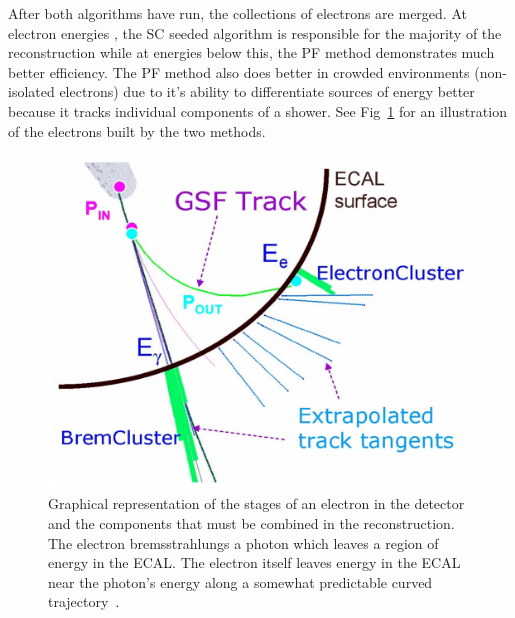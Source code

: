 	After both algorithms have run, the collections of electrons are merged. At electron energies  \GeV, the SC seeded algorithm is responsible for the majority of the reconstruction while at energies below this, the PF method demonstrates much better efficiency. The PF method also does better in crowded environments (non-isolated electrons) due to it's ability to differentiate sources of energy better because it tracks individual components of a shower. See Fig~\ref{fig:electron_reconstruction} for an illustration of the electrons built by the two methods.\\
	
	
		\begin{figure}[h]
\begin{center}
\includegraphics[width=0.70\linewidth]{Figs/elereco.pdf}
\caption{\label{fig:electron_reconstruction}
Graphical representation of the stages of an electron in the detector and the components that must be combined in the reconstruction. The electron bremsstrahlungs a photon which leaves a region of energy in the ECAL. The electron itself leaves energy in the ECAL near the photon's energy along a somewhat predictable curved trajectory~\cite{bourge}.
}
\end{center}
\end{figure}
	
	
	
	
	
	

